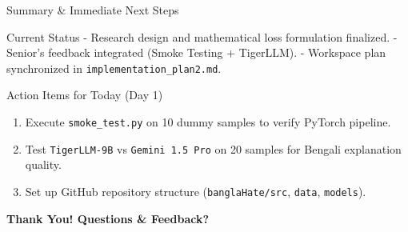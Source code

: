 \documentclass[10pt, aspectratio=169]{beamer}
\begin{document}
\begin{frame}{Summary \& Immediate Next Steps}
    \begin{alertblock}{Current Status}
        - Research design and mathematical loss formulation finalized.
        - Senior's feedback integrated (Smoke Testing + TigerLLM).
        - Workspace plan synchronized in \texttt{implementation\_plan2.md}.
    \end{alertblock}

    \begin{block}{Action Items for Today (Day 1)}
        \begin{enumerate}
            \item Execute \texttt{smoke\_test.py} on 10 dummy samples to verify PyTorch pipeline.
            \item Test \texttt{TigerLLM-9B} vs \texttt{Gemini 1.5 Pro} on 20 samples for Bengali explanation quality.
            \item Set up GitHub repository structure (\texttt{banglaHate/src}, \texttt{data}, \texttt{models}).
        \end{enumerate}
    \end{block}
    
    \begin{center}
        \Large \textbf{Thank You! Questions \& Feedback?}
    \end{center}
\end{frame}
\end{document}
